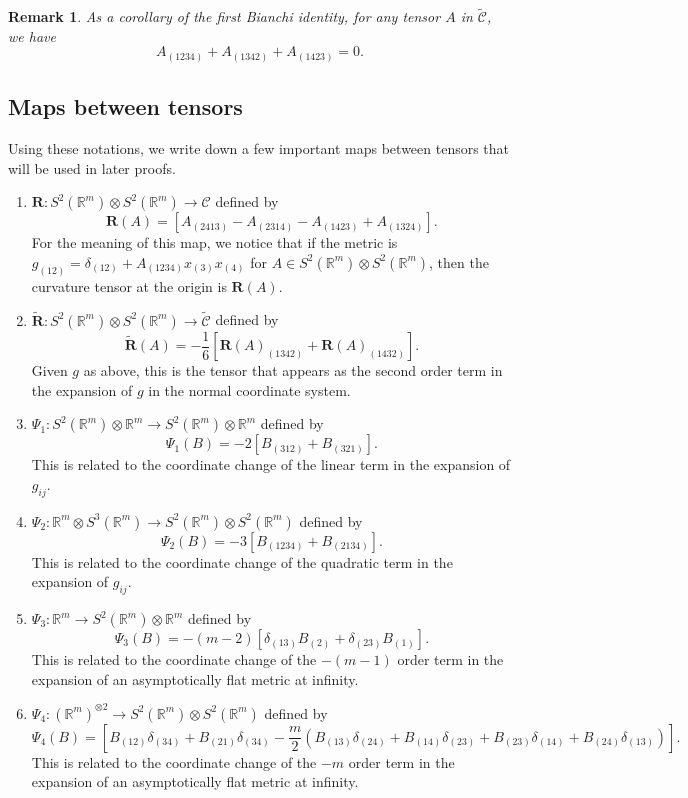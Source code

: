 \documentclass{amsart}
\newtheorem{rem}[thm]{Remark}
\newcommand{\Real}{\mathbb R}
\numberwithin{equation}{section}
\begin{document}
\begin{rem}
	\label{rem:curv_sym} As a corollary of the first Bianchi identity, for any tensor $A$ in $\widetilde{\mathcal C}$, we have
	\[
		A_{(1234)}+A_{(1342)}+A_{(1423)}=0.
	\]
\end{rem}


\subsection{Maps between tensors}
\label{subsec:maps}

Using these notations, we write down a few important maps between tensors that will be used in later proofs.\\

\begin{enumerate}
	\item ${\mathbf R}: S^2(\Real^m) \otimes S^2(\Real^m)\to \mathcal C$ defined by
		\begin{equation}
			\label{eqn:R}
			{\mathbf R}(A)= [ A_{(2413)}-A_{(2314)}-A_{(1423)}+A_{(1324)}].
		\end{equation}
		For the meaning of this map, we notice that if the metric is $g_{(12)}=\delta_{(12)}+A_{(1234)}x_{(3)}x_{(4)}$ for $A\in S^2(\Real^m) \otimes S^2(\Real^m)$, then the curvature tensor at the origin is ${\mathbf R}(A)$.
	\item $\tilde{\mathbf R}: S^2(\Real^m) \otimes S^2(\Real^m)\to \widetilde{\mathcal C}$ defined by
		\[
			\tilde{\mathbf R}(A)=  -\frac{1}{6} [{\mathbf R}(A)_{(1342)}+{\mathbf R}(A)_{(1432)}].
		\]
		Given $g$ as above, this is the tensor that appears as the second order term in the expansion of $g$ in the normal coordinate system. 

	\item $\Psi_1: S^2(\Real^m)\otimes \Real^m\to S^2(\Real^m)\otimes \Real^m$ defined by
		\[
			\Psi_1(B)=-2 [B_{(312)}+B_{(321)}].
		\]
		This is related to the coordinate change of the linear term in the expansion of $g_{ij}$. 
	\item $\Psi_2: \Real^m \otimes S^3(\Real^m)\to S^2(\Real^m)\otimes S^2(\Real^m)$ defined by
		\begin{equation*}
			\Psi_2(B)= -3[B_{(1234)}+B_{(2134)}].
		\end{equation*}
		This is related to the coordinate change of the quadratic term in the expansion of $g_{ij}$. 
	\item $\Psi_3: \Real^m\to S^2(\Real^m)\otimes \Real^m$ defined by
		\[
			\Psi_3(B)=-(m-2)[ \delta_{(13)}B_{(2)}+\delta_{(23)}B_{(1)}].
		\]
		This is related to the coordinate change of the $-(m-1)$ order term in the expansion of an asymptotically flat metric at infinity.
	\item $\Psi_4: (\Real^m)^{\otimes 2}\to S^2(\Real^m)\otimes S^2(\Real^m)$ defined by
		\[
			\Psi_4(B)= [B_{(12)}\delta_{(34)}+B_{(21)}\delta_{(34)}- \frac{m}{2}(B_{(13)}\delta_{(24)}+B_{(14)}\delta_{(23)}+B_{(23)}\delta_{(14)}+B_{(24)}\delta_{(13)})].
		\]
		This is related to the coordinate change of the $-m$ order term in the expansion of an asymptotically flat metric at infinity.


\end{enumerate}
\end{document}
